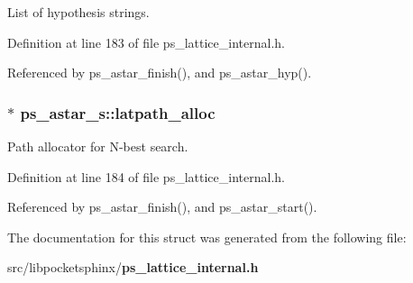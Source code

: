 \-List of hypothesis strings. 



\-Definition at line 183 of file ps\-\_\-lattice\-\_\-internal.\-h.



\-Referenced by ps\-\_\-astar\-\_\-finish(), and ps\-\_\-astar\-\_\-hyp().

\subsubsection[{latpath\-\_\-alloc}]{$\ast$ {\bf ps\-\_\-astar\-\_\-s\-::latpath\-\_\-alloc}}\label{structps__astar__s_a754bce124cd92b1b2b6aa6dbbcd73cee}


\-Path allocator for \-N-\/best search. 



\-Definition at line 184 of file ps\-\_\-lattice\-\_\-internal.\-h.



\-Referenced by ps\-\_\-astar\-\_\-finish(), and ps\-\_\-astar\-\_\-start().



\-The documentation for this struct was generated from the following file\-:\begin{DoxyCompactItemize}
\item 
src/libpocketsphinx/{\bf ps\-\_\-lattice\-\_\-internal.\-h}\end{DoxyCompactItemize}
